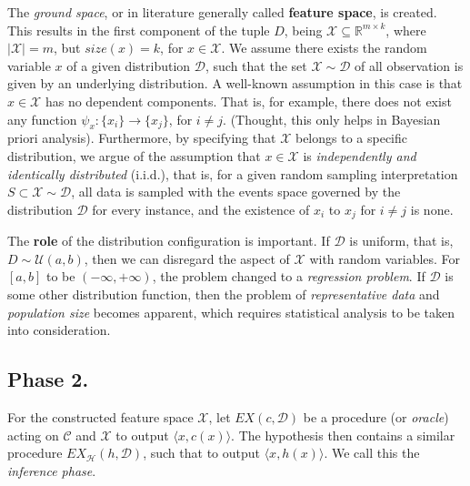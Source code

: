 \documentclass[10pt]{article} %
\begin{document}
The \textit{ground space}, or in literature generally called \textbf{feature space}, is created. This results in the first component of the tuple $D$, being $\mathcal{X}\subseteq \mathbb{R}^{m\times k}$, where $\lvert \mathcal{X} \rvert=m$, but $size(x)=k$, for $x\in\mathcal{X}$. We assume there exists the random variable $x$ of a given distribution $\mathcal{D}$, such that the set $\mathcal{X}\sim \mathcal{D}$ of all observation is given by an underlying distribution. A well-known assumption in this case is that $x\in\mathcal{X}$ has no dependent components. That is, for example, there does not exist any function $\psi_{x}: \{ x_{i} \}\to \{ x_{j} \}$, for $i\neq j$. (Thought, this only helps in Bayesian priori analysis). Furthermore, by specifying that $\mathcal{X}$ belongs to a specific distribution, we argue of the assumption that $x\in\mathcal{X}$ is \textit{independently and identically distributed} (i.i.d.), that is, for a given random sampling interpretation $S\subset\mathcal{X}\sim \mathcal{D}$, all data is sampled with the events space governed by the distribution $\mathcal{D}$ for every instance, and the existence of $x_{i}$ to $x_{j}$ for $i\neq j$ is none. 

The \textbf{role} of the distribution configuration is important. If $\mathcal{D}$ is uniform, that is, $D\sim \mathcal{U}(a,b)$, then we can disregard the aspect of $\mathcal{X}$ with random variables. For $[a,b]$ to be $(-\infty,+\infty)$, the problem changed to a \textit{regression problem}. If $\mathcal{D}$ is some other distribution function, then the problem of \textit{representative data} and \textit{population size} becomes apparent, which requires statistical analysis to be taken into consideration. 
\subsection*{Phase 2.}
For the constructed feature space $\mathcal{X}$, let $EX(c,\mathcal{D})$ be a procedure (or \textit{oracle}) acting on $\mathcal{C}$ and $\mathcal{X}$ to output $\langle x,c(x)\rangle$. The hypothesis then contains a similar procedure $EX_{\mathcal{H}}(h,\mathcal{D})$, such that to output $\langle x,h(x)\rangle$. We call this the \textit{inference phase}. 
    
\end{document}
